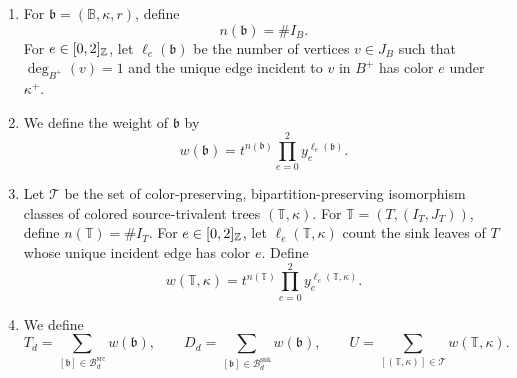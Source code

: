 \begin{definition}
\begin{enumerate}[font=\itshape]
\item\label{d:branch-statistics} For $\mathfrak b=(\mathbb B,\kappa,r)$, define
\[
 n(\mathfrak b)=\#I_{B}.
\]
For $e\in[0,2]_{\mathbb Z}$, let $\ell_e(\mathfrak b)$ be the number of vertices
$v\in J_{B}$ such that $\deg_{B^+}(v)=1$ and the unique edge incident to $v$ in $B^+$ has color $e$ under $\kappa^+$.
\item\label{d:branch-weight} We define the weight of $\mathfrak b$ by
\[
 w(\mathfrak b)=t^{n(\mathfrak b)}\prod_{e=0}^2 y_e^{\ell_e(\mathfrak b)}.
\]
\item\label{d:tree-weight} Let $\mathcal T$ be the set of color-preserving, bipartition-preserving isomorphism classes of colored source-trivalent trees $(\mathbb T,\kappa)$.
For $\mathbb T=(T,(I_T,J_T))$, define $n(\mathbb T)=\#I_T$.
For $e\in[0,2]_{\mathbb Z}$, let $\ell_e(\mathbb T,\kappa)$ count the sink leaves of $T$ whose unique incident edge has color $e$.
Define
\[
 w(\mathbb T,\kappa)=t^{n(\mathbb T)}\prod_{e=0}^2 y_e^{\ell_e(\mathbb T,\kappa)}.
\]
\item\label{d:branch-series} We define
\[
 T_d=\sum_{[\mathfrak b]\in\mathcal B_d^{\mathrm{src}}}w(\mathfrak b),\qquad
 D_d=\sum_{[\mathfrak b]\in\mathcal B_d^{\mathrm{snk}}}w(\mathfrak b),\qquad
 U=\sum_{[(\mathbb T,\kappa)]\in\mathcal T}w(\mathbb T,\kappa).
\]
\end{enumerate}
\end{definition}

